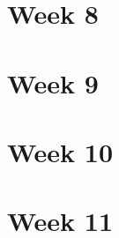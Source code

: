 \documentclass[11pt]{article}
\begin{document}
\newpage
\section{Week 8}


\newpage
\section{Week 9}


\newpage
\section{Week 10}


\newpage
\section{Week 11}

\end{document}
